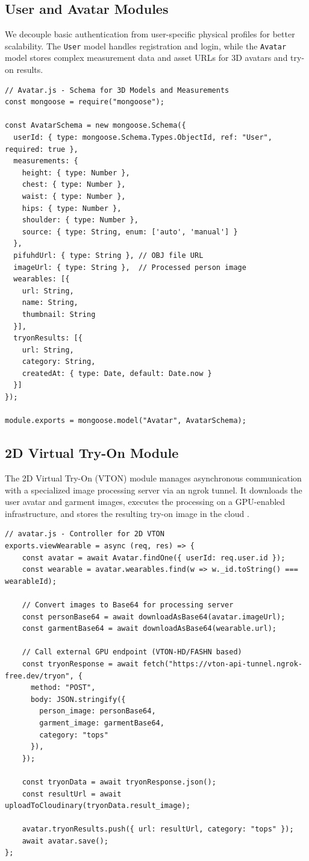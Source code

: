 \documentclass[12pt,a4paper,oneside]{report}
\begin{document}
\subsection{User and Avatar Modules}
We decouple basic authentication from user-specific physical profiles for better scalability. The \texttt{User} model handles registration and login, while the \texttt{Avatar} model stores complex measurement data and asset URLs for 3D avatars and try-on results.

\begin{verbatim}
// Avatar.js - Schema for 3D Models and Measurements
const mongoose = require("mongoose");

const AvatarSchema = new mongoose.Schema({
  userId: { type: mongoose.Schema.Types.ObjectId, ref: "User", required: true },
  measurements: {
    height: { type: Number },
    chest: { type: Number },
    waist: { type: Number },
    hips: { type: Number },
    shoulder: { type: Number },
    source: { type: String, enum: ['auto', 'manual'] }
  },
  pifuhdUrl: { type: String }, // OBJ file URL
  imageUrl: { type: String },  // Processed person image
  wearables: [{
    url: String,
    name: String,
    thumbnail: String
  }],
  tryonResults: [{
    url: String,
    category: String,
    createdAt: { type: Date, default: Date.now }
  }]
});

module.exports = mongoose.model("Avatar", AvatarSchema);
\end{verbatim}

\subsection{2D Virtual Try-On Module}
The 2D Virtual Try-On (VTON) module manages asynchronous communication with a specialized image processing server via an ngrok tunnel. It downloads the user avatar and garment images, executes the processing on a GPU-enabled infrastructure, and stores the resulting try-on image in the cloud \cite{16}.

\begin{verbatim}
// avatar.js - Controller for 2D VTON
exports.viewWearable = async (req, res) => {
    const avatar = await Avatar.findOne({ userId: req.user.id });
    const wearable = avatar.wearables.find(w => w._id.toString() === wearableId);
    
    // Convert images to Base64 for processing server
    const personBase64 = await downloadAsBase64(avatar.imageUrl);
    const garmentBase64 = await downloadAsBase64(wearable.url);

    // Call external GPU endpoint (VTON-HD/FASHN based)
    const tryonResponse = await fetch("https://vton-api-tunnel.ngrok-free.dev/tryon", {
      method: "POST",
      body: JSON.stringify({
        person_image: personBase64,
        garment_image: garmentBase64,
        category: "tops"
      }),
    });

    const tryonData = await tryonResponse.json();
    const resultUrl = await uploadToCloudinary(tryonData.result_image);
    
    avatar.tryonResults.push({ url: resultUrl, category: "tops" });
    await avatar.save();
};
\end{verbatim}
\end{document}

